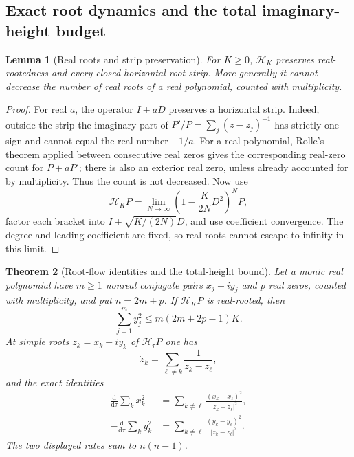 \documentclass[11pt]{article}
\newtheorem{theorem}{Theorem}[section]
\newtheorem{lemma}[theorem]{Lemma}
\theoremstyle{definition}
\theoremstyle{remark}
\newcommand{\dd}{\mathrm d}
\begin{document}
\subsection{Exact root dynamics and the total imaginary-height budget}

\begin{lemma}[Real roots and strip preservation]
\label{lem:heatblock-preservation}
For $K\ge0$, $\mathcal H_K$ preserves real-rootedness and every closed
horizontal root strip.  More generally it cannot decrease the number
of real roots of a real polynomial, counted with multiplicity.
\end{lemma}

\begin{proof}
For real $a$, the operator $I+aD$ preserves a horizontal strip.  Indeed,
outside the strip the imaginary part of $P'/P=\sum_j(z-z_j)^{-1}$ has
strictly one sign and cannot equal the real number $-1/a$.
For a real polynomial, Rolle's theorem applied between consecutive
real zeros gives the corresponding real-zero count for $P+aP'$;
there is also an exterior real zero, unless already accounted for by
multiplicity.  Thus the count is not decreased.  Now use
\[
 \mathcal H_KP=
 \lim_{N\to\infty}
 \left(1-\frac{K}{2N}D^2\right)^NP,
\]
factor each bracket into $I\pm\sqrt{K/(2N)}D$, and use coefficient
convergence.  The degree and leading coefficient are fixed, so real
roots cannot escape to infinity in this limit.
\end{proof}

\begin{theorem}[Root-flow identities and the total-height bound]
\label{thm:heatblock-total-height}
Let a monic real polynomial have $m\ge1$ nonreal conjugate pairs
$x_j\pm iy_j$ and $p$ real zeros, counted with multiplicity, and put
$n=2m+p$.  If $\mathcal H_KP$ is real-rooted, then
\begin{equation}
 \sum_{j=1}^m y_j^2\le m(2m+2p-1)K.
 \label{eq:heatblock-total-height}
\end{equation}
At simple roots $z_k=x_k+iy_k$ of $\mathcal H_\tau P$ one has
\begin{equation}
 \dot z_k=\sum_{\ell\ne k}\frac1{z_k-z_\ell},
 \label{eq:heatblock-root-flow}
\end{equation}
and the exact identities
\begin{equation}
 \begin{split}
 \frac{\dd}{\dd\tau}\sum_kx_k^2
 &=\sum_{k\ne\ell}\frac{(x_k-x_\ell)^2}{|z_k-z_\ell|^2},\\
 -\frac{\dd}{\dd\tau}\sum_ky_k^2
 &=\sum_{k\ne\ell}\frac{(y_k-y_\ell)^2}{|z_k-z_\ell|^2}.
 \end{split}
 \label{eq:heatblock-two-energies}
\end{equation}
The two displayed rates sum to $n(n-1)$.
\end{theorem}
\end{document}
